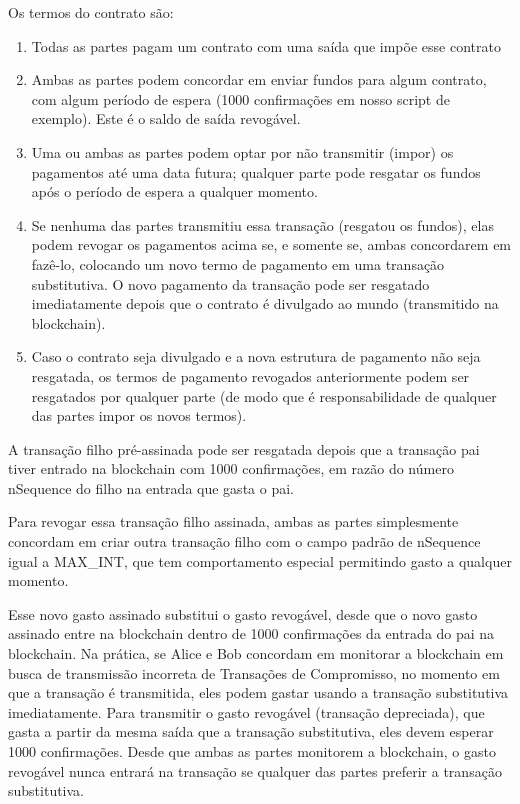 \documentclass[letterpaper,11pt]{article}
\begin{document}
Os termos do contrato são:
\begin{enumerate}
	\item Todas as partes pagam um contrato com uma saída que impõe esse
		contrato
	\item Ambas as partes podem concordar em enviar fundos para algum
		contrato, com algum período de espera (1000 confirmações em
		nosso script de exemplo). Este é o saldo de saída revogável.
	\item Uma ou ambas as partes podem optar por não transmitir (impor) os
		pagamentos até uma data futura; qualquer parte pode resgatar
		os fundos após o período de espera a qualquer momento.
	\item Se nenhuma das partes transmitiu essa transação (resgatou os
		fundos), elas podem revogar os pagamentos acima se, e somente
		se, ambas concordarem em fazê-lo, colocando um novo termo de
		pagamento em uma transação substitutiva. O novo pagamento da
		transação pode ser resgatado imediatamente depois que o
		contrato é divulgado ao mundo (transmitido na blockchain).
	\item Caso o contrato seja divulgado e a nova estrutura de pagamento
		não seja resgatada, os termos de pagamento revogados
		anteriormente podem ser resgatados por qualquer parte (de modo
		que é responsabilidade de qualquer das partes impor os novos
		termos).
\end{enumerate}

A transação filho pré-assinada pode ser resgatada depois que a transação pai
tiver entrado na blockchain com 1000 confirmações, em razão do número
nSequence do filho na entrada que gasta o pai.

Para revogar essa transação filho assinada, ambas as partes simplesmente
concordam em criar outra transação filho com o campo padrão de nSequence
igual a MAX\_INT, que tem comportamento especial permitindo gasto a qualquer
momento.

Esse novo gasto assinado substitui o gasto revogável, desde que o novo gasto
assinado entre na blockchain dentro de 1000 confirmações da entrada do pai
na blockchain. Na prática, se Alice e Bob concordam em monitorar a
blockchain em busca de transmissão incorreta de Transações de Compromisso,
no momento em que a transação é transmitida, eles podem gastar usando a
transação substitutiva imediatamente. Para transmitir o gasto revogável
(transação depreciada), que gasta a partir da mesma saída que a transação
substitutiva, eles devem esperar 1000 confirmações. Desde que ambas as
partes monitorem a blockchain, o gasto revogável nunca entrará na transação
se qualquer das partes preferir a transação substitutiva.
\end{document}
